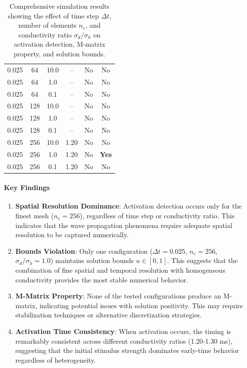 \begin{table}[H]
\begin{tabular}{cccccc}
    0.025 & 64  & 10.0 & --     & No  & No \\
    0.025 & 64  & 1.0  & --     & No  & No \\
    0.025 & 64  & 0.1  & --     & No  & No \\
    0.025 & 128 & 10.0 & --     & No  & No \\
    0.025 & 128 & 1.0  & --     & No  & No \\
    0.025 & 128 & 0.1  & --     & No  & No \\
    0.025 & 256 & 10.0 & 1.20   & No  & No \\
    0.025 & 256 & 1.0  & 1.20   & No  & \textbf{Yes} \\
    0.025 & 256 & 0.1  & 1.20   & No  & No \\
    \bottomrule
\end{tabular}
\caption{Comprehensive simulation results showing the effect of time step $\Delta t$, number of elements $n_e$, and conductivity ratio $\sigma_d/\sigma_h$ on activation detection, M-matrix property, and solution bounds.}
\label{tab:simulation_results}
\end{table}

\paragraph{Key Findings}

\begin{enumerate}
    \item \textbf{Spatial Resolution Dominance}: Activation detection occurs only for the finest mesh ($n_e = 256$), regardless of time step or conductivity ratio. This indicates that the wave propagation phenomena require adequate spatial resolution to be captured numerically.

    \item \textbf{Bounds Violation}: Only one configuration ($\Delta t = 0.025$, $n_e = 256$, $\sigma_d/\sigma_h = 1.0$) maintains solution bounds $u \in [0,1]$. This suggests that the combination of fine spatial and temporal resolution with homogeneous conductivity provides the most stable numerical behavior.

    \item \textbf{M-Matrix Property}: None of the tested configurations produce an M-matrix, indicating potential issues with solution positivity. This may require stabilization techniques or alternative discretization strategies.

    \item \textbf{Activation Time Consistency}: When activation occurs, the timing is remarkably consistent across different conductivity ratios (1.20-1.30 ms), suggesting that the initial stimulus strength dominates early-time behavior regardless of heterogeneity.
\end{enumerate}

